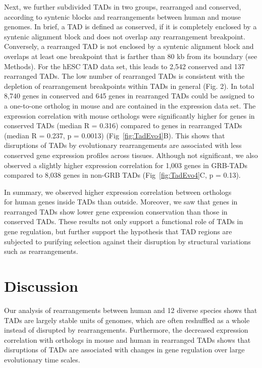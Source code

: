 \documentclass[a4paper,twoside=true,openright,parskip=full,chapterprefix=true,11pt,headings=normal,bibliography=totoc,listof=totoc,titlepage=on,captions=tableabove,draft=false]{scrreprt}
\theoremstyle{definition}
\theoremstyle{definition}
\theoremstyle{definition}
\theoremstyle{remark}
\begin{document}
Next, we further subdivided TADs in two groups, rearranged and
conserved, according to syntenic blocks and rearrangements between human
and mouse genomes. In brief, a TAD is defined as conserved, if it is
completely enclosed by a syntenic alignment block and does not overlap
any rearrangement breakpoint. Conversely, a rearranged TAD is not
enclosed by a syntenic alignment block and overlaps at least one
breakpoint that is farther than 80 kb from its boundary (see Methods).
For the hESC TAD data set, this leads to 2,542 conserved and 137
rearranged TADs. The low number of rearranged TADs is consistent with
the depletion of rearrangement breakpoints within TADs in general (Fig.
2). In total 8,740 genes in conserved and 645 genes in rearranged TADs
could be assigned to a one-to-one ortholog in mouse and are contained in
the expression data set. The expression correlation with mouse orthologs
were significantly higher for genes in conserved TADs (median R = 0.316)
compared to genes in rearranged TADs (median R = 0.237, p = 0.0013)
(Fig~\ref{fig:TadEvo4}B). This shows that disruptions of TADs by
evolutionary rearrangements are associated with less conserved gene
expression profiles across tissues. Although not significant, we also
observed a slightly higher expression correlation for 1,003 genes in
GRB-TADs compared to 8,038 genes in non-GRB TADs
(Fig~\ref{fig:TadEvo4}C, p = 0.13).

In summary, we observed higher expression correlation between
orthologs\\
for human genes inside TADs than outside. Moreover, we saw that genes in
rearranged TADs show lower gene expression conservation than those in
conserved TADs. These results not only support a functional role of TADs
in gene regulation, but further support the hypothesis that TAD regions
are subjected to purifying selection against their disruption by
structural variations such as rearrangements.

\hypertarget{discussion}{%
\section{Discussion}\label{discussion}}

Our analysis of rearrangements between human and 12 diverse species
shows that TADs are largely stable units of genomes, which are often
reshuffled as a whole instead of disrupted by rearrangements.
Furthermore, the decreased expression correlation with orthologs in
mouse and human in rearranged TADs shows that disruptions of TADs are
associated with changes in gene regulation over large evolutionary time
scales.
\end{document}
